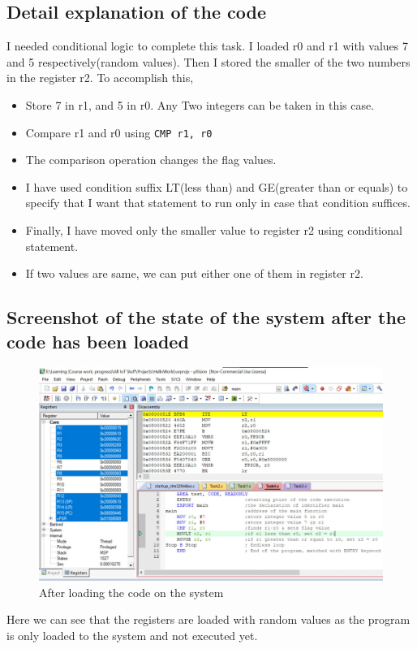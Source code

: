 \documentclass[footheight=20pt, footsepline, headheight=20pt, headsepline]{scrartcl}
\begin{document}
\subsection*{Detail explanation of the code}
I needed conditional logic to complete this task. I loaded r0 and r1 with values 7 and 5 respectively(random values). Then I stored the smaller of the two numbers in the register r2. To accomplish this,
\begin{itemize}
  \item Store 7 in r1, and 5 in r0. Any Two integers can be taken in this case.
  \item Compare r1 and r0 using \verb|CMP r1, r0|
  \item The comparison operation changes the flag values.
  \item I have used condition suffix LT(less than) and GE(greater than or equals) to specify that I want that statement to run only in case that condition suffices.
  \item Finally, I have moved only the smaller value to register r2 using conditional statement.
  \item If two values are same, we can put either one of them in register r2.
\end{itemize}
\FloatBarrier
\subsection*{Screenshot of the state of the system after the code has been loaded}
\begin{figure}[ht]
    \centering
    \includegraphics[scale=.7]{images/Task4Before1.jpg}
    \caption{After loading the code on the system}
    \label{fig:before_task_four}
\end{figure}
\FloatBarrier
Here we can see that the registers are loaded with random values as the program is only loaded to the system and not executed yet.
\end{document}
